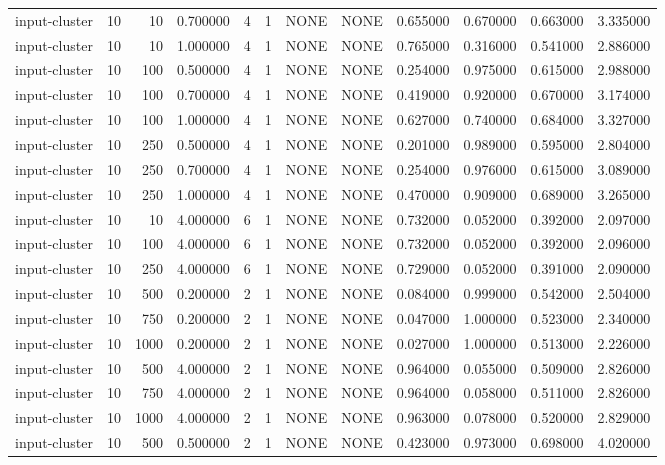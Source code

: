 \begin{tabular}{lrrrllllrrrr}
input-cluster & 10 & 10 & 0.700000 & 4 & 1 & NONE & NONE & 0.655000 & 0.670000 & 0.663000 & 3.335000 \\
input-cluster & 10 & 10 & 1.000000 & 4 & 1 & NONE & NONE & 0.765000 & 0.316000 & 0.541000 & 2.886000 \\
input-cluster & 10 & 100 & 0.500000 & 4 & 1 & NONE & NONE & 0.254000 & 0.975000 & 0.615000 & 2.988000 \\
input-cluster & 10 & 100 & 0.700000 & 4 & 1 & NONE & NONE & 0.419000 & 0.920000 & 0.670000 & 3.174000 \\
input-cluster & 10 & 100 & 1.000000 & 4 & 1 & NONE & NONE & 0.627000 & 0.740000 & 0.684000 & 3.327000 \\
input-cluster & 10 & 250 & 0.500000 & 4 & 1 & NONE & NONE & 0.201000 & 0.989000 & 0.595000 & 2.804000 \\
input-cluster & 10 & 250 & 0.700000 & 4 & 1 & NONE & NONE & 0.254000 & 0.976000 & 0.615000 & 3.089000 \\
input-cluster & 10 & 250 & 1.000000 & 4 & 1 & NONE & NONE & 0.470000 & 0.909000 & 0.689000 & 3.265000 \\
input-cluster & 10 & 10 & 4.000000 & 6 & 1 & NONE & NONE & 0.732000 & 0.052000 & 0.392000 & 2.097000 \\
input-cluster & 10 & 100 & 4.000000 & 6 & 1 & NONE & NONE & 0.732000 & 0.052000 & 0.392000 & 2.096000 \\
input-cluster & 10 & 250 & 4.000000 & 6 & 1 & NONE & NONE & 0.729000 & 0.052000 & 0.391000 & 2.090000 \\
input-cluster & 10 & 500 & 0.200000 & 2 & 1 & NONE & NONE & 0.084000 & 0.999000 & 0.542000 & 2.504000 \\
input-cluster & 10 & 750 & 0.200000 & 2 & 1 & NONE & NONE & 0.047000 & 1.000000 & 0.523000 & 2.340000 \\
input-cluster & 10 & 1000 & 0.200000 & 2 & 1 & NONE & NONE & 0.027000 & 1.000000 & 0.513000 & 2.226000 \\
input-cluster & 10 & 500 & 4.000000 & 2 & 1 & NONE & NONE & 0.964000 & 0.055000 & 0.509000 & 2.826000 \\
input-cluster & 10 & 750 & 4.000000 & 2 & 1 & NONE & NONE & 0.964000 & 0.058000 & 0.511000 & 2.826000 \\
input-cluster & 10 & 1000 & 4.000000 & 2 & 1 & NONE & NONE & 0.963000 & 0.078000 & 0.520000 & 2.829000 \\
input-cluster & 10 & 500 & 0.500000 & 2 & 1 & NONE & NONE & 0.423000 & 0.973000 & 0.698000 & 4.020000 \\

\end{tabular}
